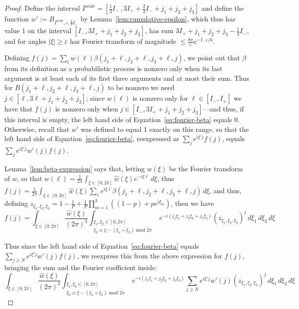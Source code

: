 \documentclass[11pt]{article}
\theoremstyle{plain}
\renewcommand{\mod}{\text{ mod }}
\newcommand{\eps}{\varepsilon}
\begin{document}
\begin{proof}


Define the interval $I^{wide}=[\frac{1}{3}I_-\,,3I_++\frac{2}{3}I_-+j_1+j_2+j_3]$ and define the function $w':=B_{I^{wide},\eps,\frac{2}{3}I_-}$ by Lemma~\ref{lem:cumulative-epsilon}, which thus has value 1 on the interval $[I_-,3I_++j_1+j_2+j_3]$, has sum $3I_++j_1+j_2+j_3-\frac{1}{3}I_-$, and for angles $|\xi|\geq \eps$ has Fourier transform of magnitude $\leq \frac{8\pi}{\eps} e^{-I_-\eps/6}$. 

Defining $f(j)=\sum_\ell w(\ell)\beta(j_1+\ell,j_2+\ell,j_3+\ell,j)$, we point out that $\beta$ from its definition as a probabilistic process is nonzero only when its last argument is at least each of its first three arguments and at most their sum. Thus for $B(j_1+\ell,j_2+\ell,j_3+\ell,j)$ to be nonzero we need $j\in [\ell,3\ell+j_1+j_2+j_3]$; since $w(\ell)$ is nonzero only for $\ell\in [I_-,I_+]$ we have that $f(j)$ is nonzero only when $j\in [I_-,3I_++j_1+j_2+j_3]$---and thus, if this interval is empty, the left hand side of Equation~\ref{eq:fourier-beta} equals 0. Otherwise, recall that $w'$ was defined to equal 1 exactly on this range, so that the left hand side of Equation~\ref{eq:fourier-beta}, reexpressed as $\sum_j e^{i\xi'j} f(j)$, equals $\sum_j e^{i\xi'j} w'(j) f(j)$.

Lemma~\ref{lem:beta-expression} says that, letting $\hat{w}(\xi)$ be the Fourier transform of $w$, so that $w(\ell)=\frac{1}{2\pi}\int_{\xi\in[0,2\pi]} \hat{w}(\xi)e^{-i\xi\ell}\,d\xi$, thus $f(j)= \frac{1}{2\pi}\int_{\xi\in[0,2\pi]} \hat{w}(\xi) \sum_\ell e^{i\xi\ell}\beta(j_1+\ell,j_2+\ell,j_3+\ell,j) \,d\xi$, and thus, defining $z_{\xi_1,\xi_2,\xi_3}=1-\frac{1}{P}+\frac{1}{P}\prod_{m=1}^3((1-p)+p e^{i \xi_m})$, then we have \[f(j)=\int_{\xi\in[0,2\pi]}\frac{\hat{w}(\xi)}{(2\pi)^3}\int_{\substack{\xi_1,\xi_2\in[0,2\pi]\\\xi_3\equiv \xi-(\xi_1+\xi_2) \mod 2\pi}}e^{-i(j_1 \xi_1+j_2\xi_2+j_3\xi_3)}(z_{\xi_1,\xi_2,\xi_3})^j\,d\xi_1\,d\xi_2\,d\xi\]

Thus since the left hand side of Equation~\ref{eq:fourier-beta} equals $\sum_{j\geq N} e^{i\xi'j} w'(j) f(j)$, we reexpress this from the above expression for $f(j)$, bringing the sum and the Fourier coefficient inside:
\begin{equation}\label{eq:fourier-beta-integral}
\int_{\xi\in[0,2\pi]}\frac{\hat{w}(\xi)}{(2\pi)^3}\int_{\substack{\xi_1,\xi_2\in[0,2\pi]\\\xi_3\equiv \xi-(\xi_1+\xi_2) \mod 2\pi}}e^{-i(j_1 \xi_1+j_2\xi_2+j_3\xi_3)}\sum_{j\geq N} e^{i\xi'j} w'(j)(z_{\xi_1,\xi_2,\xi_3})^j\,d\xi_1\,d\xi_2\,d\xi\end{equation}


\end{proof}
\end{document}
